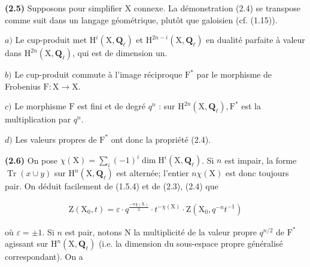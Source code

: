 \documentclass[10pt,leqno]{article}
\begin{document}
\noindent \textbf{(2.5)} Supposons pour simplifier \(\mathrm{X}\) connexe. La démonstration (2.4) se transpose comme suit dans un langage géométrique, plutôt que galoisien (cf. (1.15)).\par

\noindent \(a)\) Le cup-produit met \(\mathrm{H}^{i}(\mathrm{X},\mathbf{Q}_{\ell })\) et \(\mathrm{H}^{2n- i}(\mathrm{X},\mathbf{Q}_{\ell })\) en dualité parfaite à valeur dans \(\mathrm{H}^{2n}(\mathrm{X},\mathbf{Q}_{\ell })\), qui est de dimension un.\par

\noindent \(b)\) Le cup-produit commute à l’image réciproque \(\mathrm{F}^{*}\) par le morphisme de Frobenius \(\mathrm{F} : \mathrm{X}\longrightarrow \mathrm{X}\).\par

\noindent \(c)\) Le morphisme \(\mathrm{F}\) est fini et de degré \(q^{n}\) : sur \(\mathrm{H}^{2n}(\mathrm{X},\mathbf{Q}_{\ell }), \mathrm{F}^{*}\) est la multiplication par \(q^{n}\).\par

\noindent \(d)\) Les valeurs propres de \(\mathrm{F}^{*}\) ont donc la propriété (2.4).\par

\noindent \textbf{(2.6)} On pose \(\chi (\mathrm{X})=\sum _{i}(- 1)^{i} \operatorname{dim} \mathrm{H}^{i}(\mathrm{X},\mathbf{Q}_{\ell })\). Si \(n\) est impair, la forme \(\operatorname{Tr}(x\cup y)\) sur \(\mathrm{H}^{n}(\mathrm{X},\mathbf{Q}_{\ell })\) est alternée; l’entier \(n\chi (\mathrm{X})\) est donc toujours pair. On déduit facilement de (1.5.4) et de (2.3), (2.4) que\par

\begin{equation*}\begin{gathered}\mathrm{Z}(\mathrm{X}_{0},t) = \varepsilon \cdot q^{\frac{-n\chi(\mathrm{X})}{2}}\cdot t^{- \chi (\mathrm{X})}\cdot \mathrm{Z}(\mathrm{X}_{0},q^{- n}t^{- 1})\end{gathered}\end{equation*}

\clearpage

\label{physical-11}

\noindent où \(\varepsilon =\pm 1\). Si \(n\) est pair, notons \(\mathrm{N}\) la multiplicité de la valeur propre \(q^{n/2}\) de \(\mathrm{F}^{*}\) agissant sur \(\mathrm{H}^{n}(\mathrm{X},\mathbf{Q}_{\ell })\) (i.e. la dimension du sous-espace propre généralisé correspondant). On a\par
\end{document}
